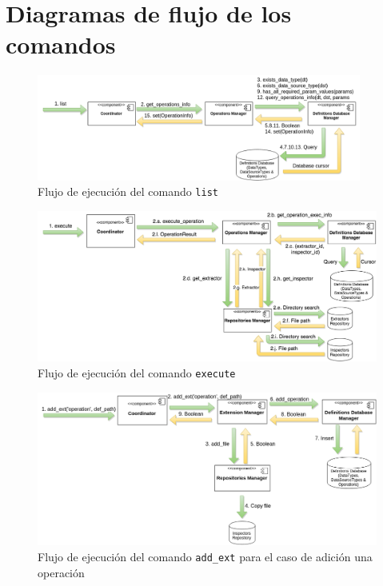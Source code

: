 \chapter{Diagramas de flujo de los comandos} \label{app:DiagramasFlujo}
\begin{figure}[H]
    \begin{center}
        \includegraphics[width=0.95\textwidth]{figures/list_operations}
        \caption{Flujo de ejecución del comando \texttt{list}}
    \end{center}
\end{figure}

\begin{figure}[H]
    \begin{center}
        \includegraphics[width=\textwidth]{figures/execute_operations}
        \caption{Flujo de ejecución del comando \texttt{execute}}
    \end{center}
\end{figure}

\begin{figure}[H]
    \begin{center}
        \includegraphics[width=\textwidth]{figures/add_ext}
        \caption{Flujo de ejecución del comando \texttt{add\_ext} para el caso de adición una operación}
    \end{center}
\end{figure}

